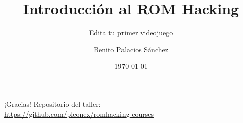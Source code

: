 \documentclass[usenames,dvipsnames]{beamer}
\title{Introducción al ROM Hacking}
\subtitle{Edita tu primer videojuego}
\date[Febrero de 2016]{\today}
\author{Benito Palacios Sánchez}
\institute[IEEE SB UGR]{Rama estudiantil de IEEE en la UGR}
\begin{document}
    {
    \begin{frame}[plain]
        \titlepage{}
    \end{frame}
    }

    
    
    


    \section{}
    \begin{frame}
        \begin{center}
            \huge ¡Gracias!
            \vfill
            \large Repositorio del taller: \\
            \url{https://github.com/pleonex/romhacking-courses}
        \end{center}
    \end{frame}
\end{document}
